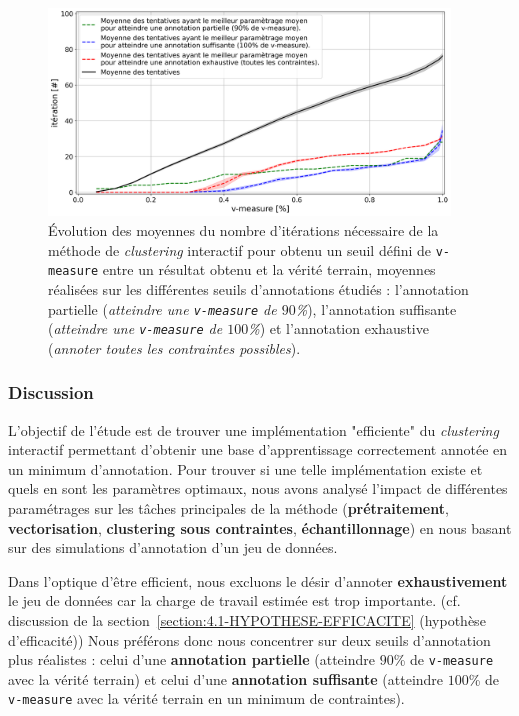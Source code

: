 			\begin{figure}[!htb]
				\centering
				\includegraphics[width=0.95\textwidth]{figures/etude-efficience-evolution-moyenne-5best-par-vmeasure}
				\caption{Évolution des moyennes du nombre d'itérations nécessaire de la méthode de \textit{clustering} interactif pour obtenu un seuil défini de \texttt{v-measure} entre un résultat obtenu et la vérité terrain, moyennes réalisées sur les différentes seuils d'annotations étudiés : l'annotation partielle (\textit{atteindre une \texttt{v-measure} de $90$\%}), l'annotation suffisante (\textit{atteindre une \texttt{v-measure} de $100$\%}) et l'annotation exhaustive (\textit{annoter toutes les contraintes possibles}).}
				\label{figure:4.2.1-ETUDE-OPTIMISATION-EVOLUTION-MEILLEUR-PARAMETRAGE}
			\end{figure}

		\subsubsection{Discussion}

			L'objectif de l'étude est de trouver une implémentation "efficiente" du \textit{clustering} interactif permettant d'obtenir une base d'apprentissage correctement annotée en un minimum d'annotation.
			Pour trouver si une telle implémentation existe et quels en sont les paramètres optimaux, nous avons analysé l'impact de différentes paramétrages sur les tâches principales de la méthode (\textbf{prétraitement}, \textbf{vectorisation}, \textbf{clustering sous contraintes}, \textbf{échantillonnage}) en nous basant sur des simulations d'annotation d'un jeu de données.
			
			Dans l'optique d'être efficient, nous excluons le désir d'annoter \textbf{exhaustivement} le jeu de données car la charge de travail estimée est trop importante.
			(cf. discussion de la section~\ref{section:4.1-HYPOTHESE-EFFICACITE} (hypothèse d'efficacité))
			Nous préférons donc nous concentrer sur deux seuils d'annotation plus réalistes : celui d'une \textbf{annotation partielle} (atteindre $90$\% de \texttt{v-measure} avec la vérité terrain) et celui d'une \textbf{annotation suffisante} (atteindre $100$\% de \texttt{v-measure} avec la vérité terrain en un minimum de contraintes). 
			
